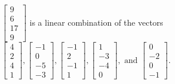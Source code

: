 \begin{exercise}
\begin{exerciseStatement}
  \end{exerciseStatement}
  \begin{exerciseAnswer}
   \(\left[\begin{array}{c}
9 \\
6 \\
17 \\
9
\end{array}\right]\) 
  	 is  
	a linear combination of the vectors \(\left[\begin{array}{c}
4 \\
2 \\
4 \\
1
\end{array}\right] , \left[\begin{array}{c}
-1 \\
0 \\
-5 \\
-3
\end{array}\right] , \left[\begin{array}{c}
-1 \\
2 \\
-1 \\
1
\end{array}\right] , \left[\begin{array}{c}
1 \\
-3 \\
-4 \\
0
\end{array}\right] , \text{ and } \left[\begin{array}{c}
0 \\
-2 \\
0 \\
-1
\end{array}\right]\).

	
  


  \end{exerciseAnswer}
\end{exercise}